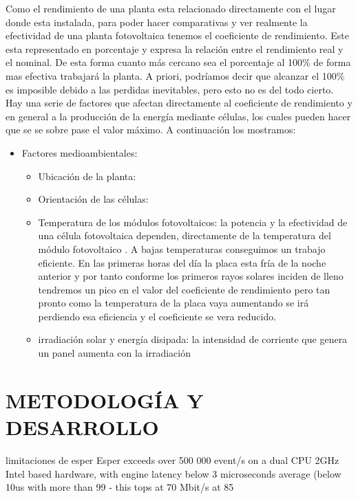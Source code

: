 \documentclass[spanish,twoside,openright,12pt,a4paper]{book}
\begin{document}
Como el rendimiento de una planta esta relacionado directamente con el lugar donde esta instalada, para poder hacer comparativas y ver realmente la efectividad de una planta fotovoltaica tenemos el coeficiente de rendimiento. Este esta representado en porcentaje y expresa la relación entre el rendimiento real y el nominal. De esta forma cuanto más cercano sea el porcentaje al 100\% de forma mas efectiva trabajará la planta. A priori, podríamos decir que alcanzar el 100\% es imposible debido a las perdidas inevitables, pero esto no es del todo cierto. Hay una serie de factores que afectan directamente al coeficiente de rendimiento \cite{coeficienteDeRendimiento} y en general a la producción de la energía mediante células, los cuales pueden hacer que se se sobre pase el valor máximo. A continuación los mostramos:
\begin{itemize}
\item Factores medioambientales:
	\begin{itemize}
    \item Ubicación de la planta: 
    \item Orientación de las células: 
	\item Temperatura de los módulos fotovoltaicos: la potencia y la efectividad de una célula fotovoltaica dependen, directamente de la temperatura del módulo fotovoltaico \cite{webEnergyGovSolarPerformace}. A bajas temperaturas conseguimos un trabajo eficiente. En las primeras horas del día la placa esta fría de la noche anterior y por tanto conforme los primeros rayos solares inciden de lleno tendremos un pico en el valor del coeficiente de rendimiento pero tan pronto como la temperatura de la placa vaya aumentando se irá perdiendo esa eficiencia y el coeficiente se vera reducido.
    \item irradiación solar y energía disipada: la intensidad de corriente que genera un panel aumenta con la irradiación
	\end{itemize}
\end{itemize}



\chapter{METODOLOGÍA Y DESARROLLO}
\label{CapituloMetodologia}

limitaciones de esper
Esper exceeds over 500 000 event/s on a dual CPU 2GHz Intel based hardware,
with engine latency below 3 microseconds average (below 10us with more than 
99%
- this tops at 70 Mbit/s at 85%
\end{document}
